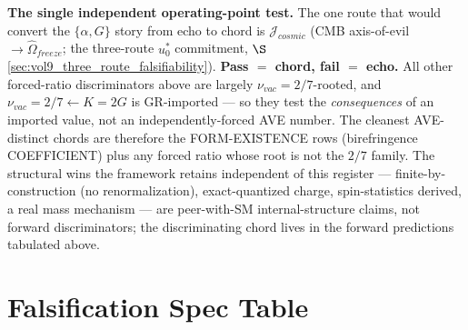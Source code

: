 \noindent
\textbf{The single independent operating-point test.} The one route that would convert the $\{\alpha, G\}$ story from echo to chord is $\mathcal{J}_{cosmic}$ (CMB axis-of-evil $\to \hat{\Omega}_{freeze}$; the three-route $u_0^*$ commitment, $\S$\ref{sec:vol9_three_route_falsifiability}). \textbf{Pass $=$ chord, fail $=$ echo.} All other forced-ratio discriminators above are largely $\nu_{vac} = 2/7$-rooted, and $\nu_{vac} = 2/7 \leftarrow K = 2G$ is GR-imported --- so they test the \emph{consequences} of an imported value, not an independently-forced AVE number. The cleanest AVE-distinct chords are therefore the FORM-EXISTENCE rows (birefringence COEFFICIENT) plus any forced ratio whose root is not the $2/7$ family. The structural wins the framework retains independent of this register --- finite-by-construction (no renormalization), exact-quantized charge, spin-statistics derived, a real mass mechanism --- are peer-with-SM internal-structure claims, not forward discriminators; the discriminating chord lives in the forward predictions tabulated above.

\section{Falsification Spec Table}
\label{sec:vol9_falsification_spec_table}

